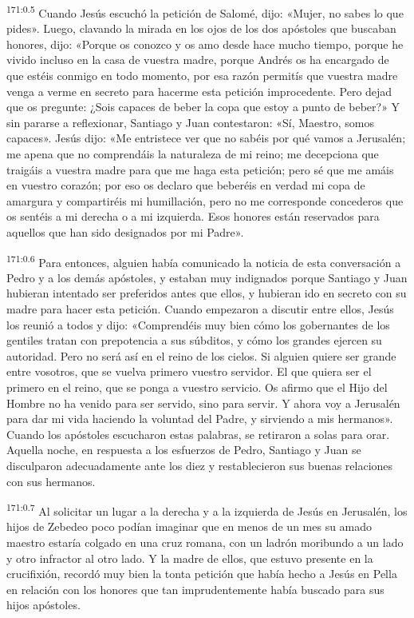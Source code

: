 \par 
\textsuperscript{171:0.5} Cuando Jesús escuchó la petición de Salomé, dijo: «Mujer, no sabes lo que pides». Luego, clavando la mirada en los ojos de los dos apóstoles que buscaban honores, dijo: «Porque os conozco y os amo desde hace mucho tiempo, porque he vivido incluso en la casa de vuestra madre, porque Andrés os ha encargado de que estéis conmigo en todo momento, por esa razón permitís que vuestra madre venga a verme en secreto para hacerme esta petición improcedente. Pero dejad que os pregunte: ¿Sois capaces de beber la copa que estoy a punto de beber?» Y sin pararse a reflexionar, Santiago y Juan contestaron: «Sí, Maestro, somos capaces». Jesús dijo: «Me entristece ver que no sabéis por qué vamos a Jerusalén; me apena que no comprendáis la naturaleza de mi reino; me decepciona que traigáis a vuestra madre para que me haga esta petición; pero sé que me amáis en vuestro corazón; por eso os declaro que beberéis en verdad mi copa de amargura y compartiréis mi humillación, pero no me corresponde concederos que os sentéis a mi derecha o a mi izquierda. Esos honores están reservados para aquellos que han sido designados por mi Padre».

\par 
\textsuperscript{171:0.6} Para entonces, alguien había comunicado la noticia de esta conversación a Pedro y a los demás apóstoles, y estaban muy indignados porque Santiago y Juan hubieran intentado ser preferidos antes que ellos, y hubieran ido en secreto con su madre para hacer esta petición. Cuando empezaron a discutir entre ellos, Jesús los reunió a todos y dijo: «Comprendéis muy bien cómo los gobernantes de los gentiles tratan con prepotencia a sus súbditos, y cómo los grandes ejercen su autoridad. Pero no será así en el reino de los cielos. Si alguien quiere ser grande entre vosotros, que se vuelva primero vuestro servidor. El que quiera ser el primero en el reino, que se ponga a vuestro servicio. Os afirmo que el Hijo del Hombre no ha venido para ser servido, sino para servir. Y ahora voy a Jerusalén para dar mi vida haciendo la voluntad del Padre, y sirviendo a mis hermanos». Cuando los apóstoles escucharon estas palabras, se retiraron a solas para orar. Aquella noche, en respuesta a los esfuerzos de Pedro, Santiago y Juan se disculparon adecuadamente ante los diez y restablecieron sus buenas relaciones con sus hermanos.

\par 
\textsuperscript{171:0.7} Al solicitar un lugar a la derecha y a la izquierda de Jesús en Jerusalén, los hijos de Zebedeo poco podían imaginar que en menos de un mes su amado maestro estaría colgado en una cruz romana, con un ladrón moribundo a un lado y otro infractor al otro lado. Y la madre de ellos, que estuvo presente en la crucifixión, recordó muy bien la tonta petición que había hecho a Jesús en Pella en relación con los honores que tan imprudentemente había buscado para sus hijos apóstoles.

